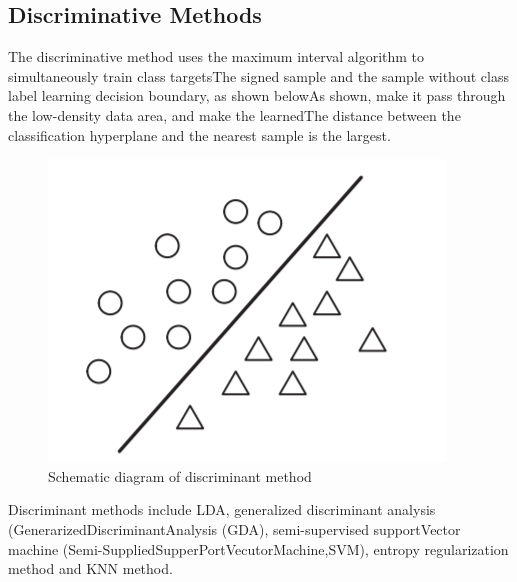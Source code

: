 \documentclass[11pt,en]{elegantpaper}
\begin{document}
\subsection{Discriminative Methods}
The discriminative method uses the maximum interval algorithm to simultaneously train class targetsThe signed sample and the sample without class label learning decision boundary, as shown belowAs shown, make it pass through the low-density data area, and make the learnedThe distance between the classification hyperplane and the nearest sample is the largest.
\begin{figure}[H]
		\centering
		\includegraphics[scale=0.4]{figure/2.png}
		\caption{Schematic diagram of discriminant method}
\end{figure}
Discriminant methods include LDA, generalized discriminant analysis (GenerarizedDiscriminantAnalysis (GDA), semi-supervised supportVector machine (Semi-SuppliedSupperPortVecutorMachine,SVM), entropy regularization method and KNN method.
\end{document}
